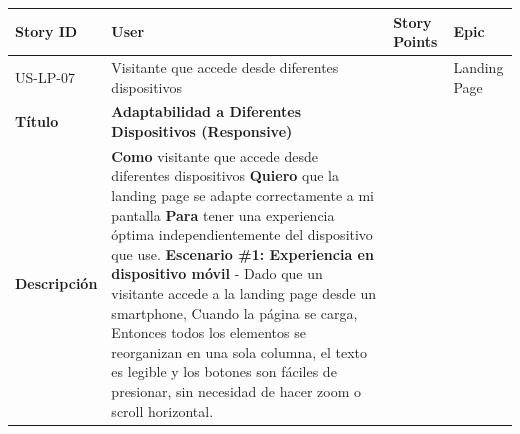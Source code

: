 {\def\LTcaptype{none} %
\begin{longtable}[]{@{}
  >{\raggedright\arraybackslash}p{}
  >{\raggedright\arraybackslash}p{}
  >{\raggedright\arraybackslash}p{}
  >{\raggedright\arraybackslash}p{}@{}}
\toprule\noalign{}
\begin{minipage}[b]{\linewidth}\raggedright
Story ID
\end{minipage} & \begin{minipage}[b]{\linewidth}\raggedright
User
\end{minipage} & \begin{minipage}[b]{\linewidth}\raggedright
Story Points
\end{minipage} & \begin{minipage}[b]{\linewidth}\raggedright
Epic
\end{minipage} \\
\midrule\noalign{}
\endhead
\bottomrule\noalign{}
\endlastfoot
US-LP-07 & Visitante que accede desde diferentes dispositivos & 5 &
Landing Page \\
\textbf{Título} & \textbf{Adaptabilidad a Diferentes Dispositivos
(Responsive)} & & \\
\textbf{Descripción} & \textbf{Como} visitante que accede desde
diferentes dispositivos \textbf{Quiero} que la landing page se adapte
correctamente a mi pantalla \textbf{Para} tener una experiencia óptima
independientemente del dispositivo que use. \textbf{Escenario \#1:
Experiencia en dispositivo móvil} - Dado que un visitante accede a la
landing page desde un smartphone, Cuando la página se carga, Entonces
todos los elementos se reorganizan en una sola columna, el texto es
legible y los botones son fáciles de presionar, sin necesidad de hacer
zoom o scroll horizontal. & & \\
\end{longtable}
}

